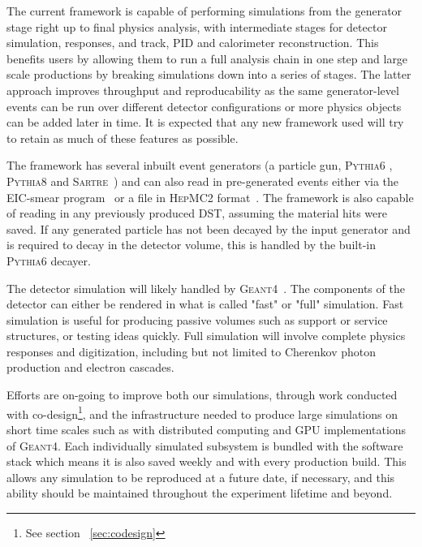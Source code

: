 	The current framework is capable of performing simulations from the generator stage right up to final physics analysis, with intermediate stages for detector simulation, responses, and track, PID and calorimeter reconstruction. This benefits users by allowing them to run a full analysis chain in one step and large scale productions by breaking simulations down into a series of stages. The latter approach improves throughput and reproducability as the same generator-level events can be run over different detector configurations or more physics objects can be added later in time. It is expected that any new framework used will try to retain as much of these features as possible.
	
	The framework has several inbuilt event generators (a particle gun, \textsc{Pythia6} \cite{Sjostrand:2000wi}, \textsc{Pythia8} \cite{sjostrand2008brief} and \textsc{Sartre}~\cite{toll2014dipole}) and can also read in pre-generated events either via the EIC-smear program~\cite{eicsmear} or a file in \textsc{HepMC2} format~\cite{dobbs2001hepmc}. The framework is also capable of reading in any previously produced DST, assuming the material hits were saved. If any generated particle has not been decayed by the input generator and is required to decay in the detector volume, this is handled by the built-in \textsc{Pythia6} decayer. 
	
	The detector simulation will likely handled by \textsc{Geant4}~\cite{Agostinelli:2002hh}. The components of the detector can either be rendered in what is called "fast" or "full" simulation. Fast simulation is useful for producing passive volumes such as support or service structures, or testing ideas quickly. Full simulation will involve complete physics responses and digitization, including but not limited to Cherenkov photon production and electron cascades. 
	
	Efforts are on-going to improve both our simulations, through work conducted with co-design\footnote{See section ~\ref{sec:codesign}}, and the infrastructure needed to produce large simulations on short time scales such as with distributed computing and GPU implementations of \textsc{Geant4}. Each individually simulated subsystem is bundled with the software stack which means it is also saved weekly and with every production build. This allows any simulation to be reproduced at a future date, if necessary, and this ability should be maintained throughout the experiment lifetime and beyond. 
	
